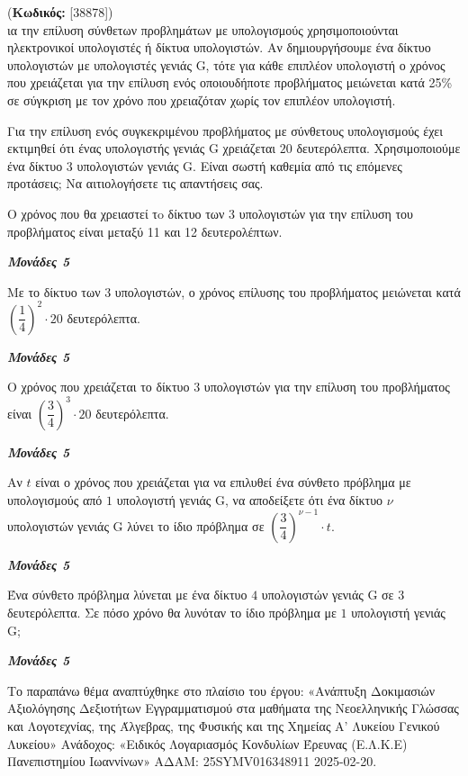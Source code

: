 \documentclass[11pt,a4paper,twoside]{book}
\newcounter{askhsh}[chapter]
\renewcommand{\theaskhsh}{
	\bf{\titlefont{\Large{\thechapter}}.\arabic{askhsh}}
}
\newcommand{\Askhsh}[2]{\refstepcounter{askhsh}{\titlefont{Άσκηση\theaskhsh} - \textcolor{maincolor}{ΘΕΜΑ #2}} (\small{\textbf{Κωδικός:} #1})\\}{}
\newcommand{\monades}[1]{
\hspace*{\fill}
\textbf{\textit{\textcolor{maincolor}{Μονάδες #1}}}}
\begin{document}
\vspace{4mm}

\Askhsh{[38878]}
Για την επίλυση σύνθετων προβλημάτων με υπολογισμούς χρησιμοποιούνται ηλεκτρονικοί υπολογιστές ή δίκτυα υπολογιστών. Αν δημιουργήσουμε ένα δίκτυο υπολογιστών με υπολογιστές γενιάς G, τότε για κάθε επιπλέον υπολογιστή ο χρόνος που χρειάζεται για την επίλυση ενός οποιουδήποτε προβλήματος μειώνεται κατά 25\% σε σύγκριση με τον χρόνο που χρειαζόταν χωρίς τον επιπλέον υπολογιστή.

\begin{alist}
\item Για την επίλυση ενός συγκεκριμένου προβλήματος με σύνθετους υπολογισμούς έχει εκτιμηθεί ότι ένας υπολογιστής γενιάς G χρειάζεται $20$ δευτερόλεπτα. Χρησιμοποιούμε ένα δίκτυο $3$ υπολογιστών γενιάς G. Είναι σωστή καθεμία από τις επόμενες προτάσεις; Να αιτιολογήσετε τις απαντήσεις σας.

\begin{rlist}
\item Ο χρόνος που θα χρειαστεί τo δίκτυο των $3$ υπολογιστών για την επίλυση του προβλήματος είναι μεταξύ 11 και 12 δευτερολέπτων.
\monades{5}
\item Με το δίκτυο των $3$ υπολογιστών, ο χρόνος επίλυσης του προβλήματος μειώνεται κατά $\left( \dfrac{1}{4} \right)^{2} \cdot 20$ δευτερόλεπτα.
\monades{5}
\item Ο χρόνος που χρειάζεται το δίκτυο $3$ υπολογιστών για την επίλυση του προβλήματος είναι $\left( \dfrac{3}{4} \right)^{3} \cdot 20$ δευτερόλεπτα.
\monades{5}
\end{rlist}
\item Αν $t$ είναι ο χρόνος που χρειάζεται για να επιλυθεί ένα σύνθετο πρόβλημα με υπολογισμούς από $1$ υπολογιστή γενιάς G, να αποδείξετε ότι ένα δίκτυο $\nu$ υπολογιστών γενιάς G λύνει το ίδιο πρόβλημα σε $\left( \dfrac{3}{4} \right)^{\nu - 1} \cdot t$.
\monades{5}
\item Ένα σύνθετο πρόβλημα λύνεται με ένα δίκτυο $4$ υπολογιστών γενιάς G σε $3$ δευτερόλεπτα. Σε πόσο χρόνο θα λυνόταν το ίδιο πρόβλημα με $1$ υπολογιστή γενιάς G;
\monades{5}

{\footnotesize Το παραπάνω θέμα αναπτύχθηκε στο πλαίσιο του έργου: «Ανάπτυξη Δοκιμασιών Αξιολόγησης Δεξιοτήτων Εγγραμματισμού στα μαθήματα της Νεοελληνικής Γλώσσας και Λογοτεχνίας, της Άλγεβρας, της Φυσικής και της Χημείας Α' Λυκείου Γενικού Λυκείου» Ανάδοχος: «Ειδικός Λογαριασμός Κονδυλίων Έρευνας (Ε.Λ.Κ.Ε) Πανεπιστημίου Ιωαννίνων» ΑΔΑΜ: 25SYMV016348911 2025-02-20.}
\end{alist}
\end{document}
